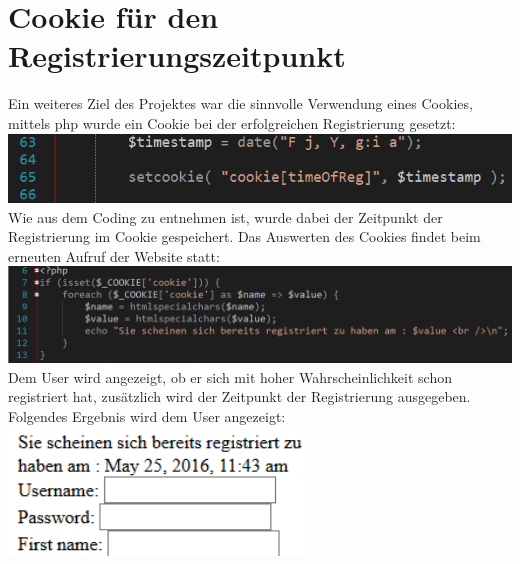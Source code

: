 \section{Cookie für den Registrierungszeitpunkt}
Ein weiteres Ziel des Projektes war die sinnvolle Verwendung eines Cookies, mittels php wurde ein Cookie bei der erfolgreichen Registrierung gesetzt:
\newline
\includegraphics[width=1\textwidth]{img/vincent/abb18.png}
\newline
Wie aus dem Coding zu entnehmen ist, wurde dabei der Zeitpunkt der Registrierung im Cookie gespeichert. Das Auswerten des Cookies findet beim erneuten Aufruf der Website statt:
\newline
\includegraphics[width=1\textwidth]{img/vincent/abb19.png}
\newline
Dem User wird angezeigt, ob er sich mit hoher Wahrscheinlichkeit schon registriert hat, zus\"atzlich wird der Zeitpunkt der Registrierung ausgegeben. Folgendes Ergebnis wird dem User angezeigt:
\newline
\includegraphics[width=0.6\textwidth]{img/vincent/abb20.png}
\newline

